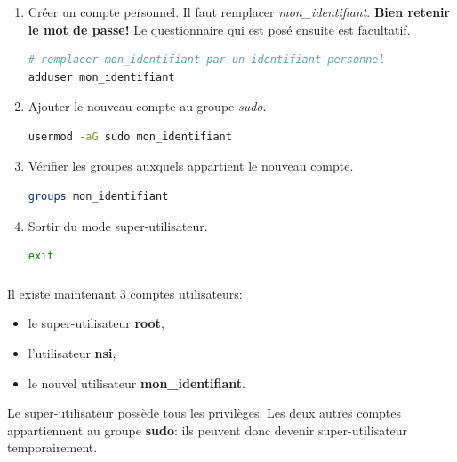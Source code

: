 \documentclass[svgnames,11pt]{beamer}
\begin{document}
\begin{frame}[fragile]
    \frametitle{}

\begin{activite}
\begin{enumerate}
\item Créer un compte personnel. Il faut remplacer \emph{mon\_identifiant}. \textbf{Bien retenir le mot de passe!} Le questionnaire qui est posé ensuite est facultatif.
\begin{lstlisting}[language=bash, basicstyle=\ttfamily\small, xleftmargin=2em, xrightmargin=2em]
# remplacer mon_identifiant par un identifiant personnel
adduser mon_identifiant
\end{lstlisting}
\item Ajouter le nouveau compte au groupe \emph{sudo}.
\begin{lstlisting}[language=bash, basicstyle=\ttfamily\small, xleftmargin=2em, xrightmargin=2em]
usermod -aG sudo mon_identifiant
\end{lstlisting}
\item Vérifier les groupes auxquels appartient le nouveau compte.
\begin{lstlisting}[language=bash, basicstyle=\ttfamily\small, xleftmargin=2em, xrightmargin=2em]
groups mon_identifiant
\end{lstlisting}
\item Sortir du mode super-utilisateur.
\begin{lstlisting}[language=bash, basicstyle=\ttfamily\small, xleftmargin=2em, xrightmargin=2em]
exit
\end{lstlisting}
\end{enumerate}
\end{activite}

\end{frame}
\begin{frame}
    \frametitle{}

    Il existe maintenant 3 comptes utilisateurs:
    \begin{itemize}
        \item le super-utilisateur \textbf{root},
        \item l'utilisateur \textbf{nsi},
        \item le nouvel utilisateur \textbf{mon\_identifiant}.
    \end{itemize}

    Le super-utilisateur possède tous les privilèges. Les deux autres comptes appartiennent au groupe \textbf{sudo}: ils peuvent donc devenir super-utilisateur temporairement.
\end{frame}
\end{document}
